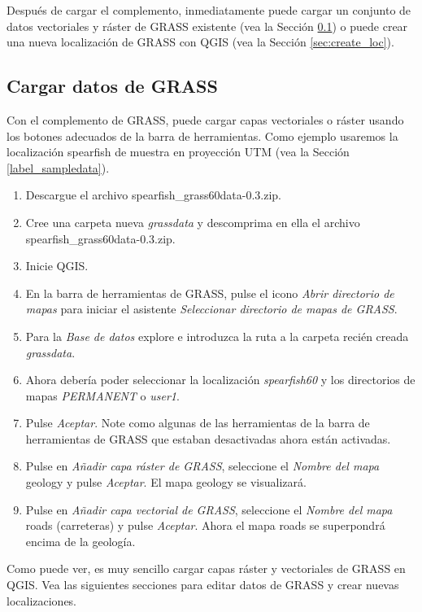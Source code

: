 Después de cargar el complemento, inmediatamente puede cargar un conjunto de datos vectoriales y ráster de GRASS existente (vea la Sección \ref{sec:load_grassdata}) o puede crear una nueva localización de GRASS con QGIS (vea la Sección \ref{sec:create_loc}).

\subsection{Cargar datos de GRASS}\label{sec:load_grassdata}

Con el complemento de GRASS, puede cargar capas vectoriales o ráster usando los botones adecuados de la barra de herramientas. Como ejemplo usaremos la localización spearfish de muestra en proyección UTM (vea la Sección \ref{label_sampledata}).

\begin{enumerate}
  \item Descargue el archivo spearfish\_grass60data-0.3.zip.
  \item Cree una carpeta nueva \textsl{grassdata} y descomprima en ella el archivo spearfish\_grass60data-0.3.zip.
  \item Inicie QGIS.
  \item En la barra de herramientas de GRASS, pulse el icono \textsl{Abrir directorio de mapas} para iniciar el asistente \textsl{Seleccionar directorio de mapas de GRASS}.
  \item Para la \textsl{Base de datos} explore e introduzca la ruta a la carpeta recién creada \textsl{grassdata}.
  \item Ahora debería poder seleccionar la localización \textsl{spearfish60} y los directorios de mapas \textsl{PERMANENT} o \textsl{user1}. 
  \item Pulse \textsl{Aceptar}. Note como algunas de las herramientas de la barra de herramientas de GRASS que estaban desactivadas ahora están activadas.
  \item Pulse en \textsl{Añadir capa ráster de GRASS}, seleccione el \textsl{Nombre del mapa} geology y pulse \textsl{Aceptar}. El mapa geology se visualizará. 
  \item Pulse en \textsl{Añadir capa vectorial de GRASS}, seleccione el \textsl{Nombre del mapa} roads (carreteras) y pulse \textsl{Aceptar}. Ahora el mapa roads se superpondrá encima de la geología.  
\end{enumerate}

Como puede ver, es muy sencillo cargar capas ráster y vectoriales de GRASS en QGIS. Vea las siguientes secciones para editar datos de GRASS y crear nuevas localizaciones.

